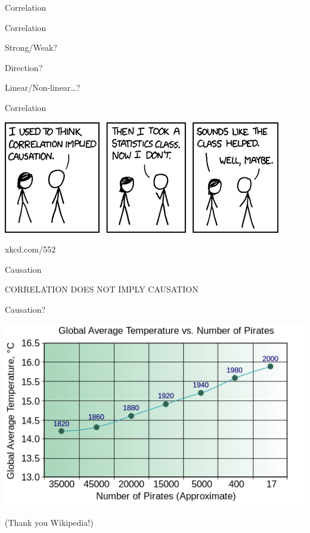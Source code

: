 \documentclass{beamer}
\begin{document}
\begin{frame}{Correlation}
\end{frame}

\begin{frame}{Correlation}

Strong/Weak?

\vspace{5mm}

Direction?

\vspace{5mm}

Linear/Non-linear\ldots?

\end{frame}


\begin{frame}{Correlation}

\begin{center}
\includegraphics[scale=0.7]{pics/wk3/correlation.png}
\end{center}

xkcd.com/552


\end{frame}


\begin{frame}{Causation}

CORRELATION DOES NOT IMPLY CAUSATION

\end{frame}



\begin{frame}{Causation?}

\begin{center}
\includegraphics[scale=0.6]{pics/wk3/pirates_new.png}
\end{center}

(Thank you Wikipedia!)


\end{frame}
\end{document}
